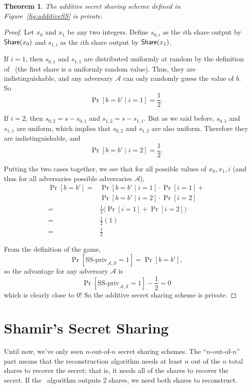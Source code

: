 \documentclass[12 pt]{article}
\newtheorem{theorem}{Theorem}
\def\A{\ensuremath{\mathcal{A}}}
\def\ss{\ensuremath{\mathcal{S}}}
\begin{document}
\begin{theorem}
    The additive secret sharing scheme defined in Figure~\ref{fig:additiveSS}
    is private.
\end{theorem}
\begin{proof}
    Let $x_0$ and $x_1$ be any two integers. Define $s_{0,i}$ as
    the $i$th share output by $\mathsf{Share}(x_0)$ and $s_{1,i}$ as the 
    $i$th share output by $\mathsf{Share}(x_1)$.

    If $i=1$, then $s_{0,1}$ and $s_{1,1}$ are distributed uniformly 
    at random by the definition of \share~(the first share is 
    a uniformly random value). Thus, they are indistinguishable,
    and any adversary $\A$ can only randomly guess the value of $b$.
    So
    \[
        \Pr[b=b' \mid i=1] = \frac{1}{2}.
    \]

    If $i=2$, then $s_{0,2} = s-s_{0,1}$ and $s_{1,2} = s-s_{1,1}$.
    But as we said before, $s_{0,1}$ and $s_{1,1}$ are uniform,
    which implies that $s_{0,2}$ and $s_{1,2}$ are also uniform.
    Therefore they are indistinguishable, and 
    \[
        \Pr[b=b' \mid i=2] = \frac{1}{2}.
    \]

    Putting the two cases together, we see that for all possible 
    values of $x_0, x_1, i$ (and thus for all adversaries possible
    adversaries $\A$),
    \begin{align*}
        \Pr[b=b']
        =& \Pr[b=b' \mid i=1]\cdot\Pr[i=1] + \\
        & \Pr[b=b' \mid i=2]\cdot\Pr[i=2]\\
        =& \frac{1}{2} \big(\Pr[i=1]+\Pr[i=2]\big)\\
        =& \frac{1}{2}(1)\\
        =& \frac{1}{2}
    \end{align*}

    From the definition of the game, 
    \[
        \Pr[\text{SS-priv}_{\A,\ss}=1] = \Pr[b=b'],
    \]
    so the advantage for any adversary $\A$ is
    \[
        \Pr[\text{SS-priv}_{\A,\ss}=1] - \frac{1}{2} = 0
    \]
    which is clearly close to 0! So the additive secret sharing 
    scheme is private.
\end{proof}

\newpage
\section{Shamir's Secret Sharing}

Until now, we've only seen $n$-out-of-$n$ secret sharing schemes. The ``$n$-out-of-$n$'' part means that 
the reconstruction algorithm needs at least $n$ out of the $n$ total shares to recover the
secret; that is, it needs all of the shares to recover the secret. If the 
\share~algorithm outputs 2 shares, we need both shares to reconstruct.
\end{document}
